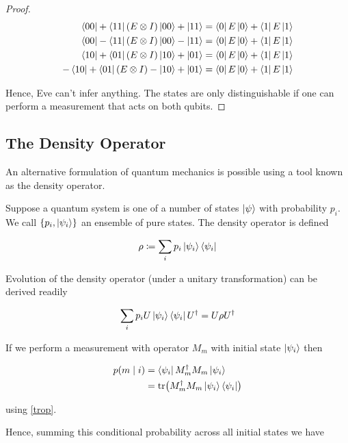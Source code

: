 \documentclass[11pt]{article}
\newcommand\0{\mathbf{0}}
\newcommand\<{\langle}
\renewcommand\>{\rangle}
\begin{document}
\begin{proof}
\begin{align*}
	\bra{00} + \bra{11} (E \otimes I) \ket{00} + \ket{11} &= \bra{0}E\ket{0} + \bra{1}E\ket{1}\\
 	\bra{00} - \bra{11}(E \otimes I)\ket{00} - \ket{11}&= \bra{0}E\ket{0} + \bra{1}E\ket{1}\\
 	\bra{10} + \bra{01} (E \otimes I)\ket{10} + \ket{01} &= \bra{0}E\ket{0} + \bra{1}E\ket{1}\\
 	-\bra{10} + \bra{01}(E \otimes I)-\ket{10} + \ket{01} &= \bra{0}E\ket{0} + \bra{1}E\ket{1}\\
\end{align*}
	
	Hence, Eve can't infer anything. The states are only distinguishable if one can perform a measurement that acts on both qubits.  
\end{proof}


\subsection{The Density Operator}

An alternative formulation of quantum mechanics is possible using a tool known as the density operator. 

Suppose a quantum system is one of a number of states $\ket{\psi}$ with probability $p_i$. We call $\{p_i, \ket{\psi_i} \}$ an ensemble of pure states. The density operator is defined

\begin{align*}
\rho \coloneqq \sum_i p_i \ket{\psi_i}\bra{\psi_i}	
\end{align*}

Evolution of the density operator (under a unitary transformation) can be derived readily

\begin{align*}
\sum_i p_i U\ket{\psi_i}\bra{\psi_i}U^\dag = U\rho U^\dag	
\end{align*}

If we perform a measurement with operator $M_m$ with initial state $\ket{\psi_i}$ then

\begin{align*}
p(m\mid i) &= \bra{\psi_i} M_m^\dag M_m \ket{\psi_i} \\
&= \tr(M_m^\dag M_m \ket{\psi_i}\bra{\psi_i})
\end{align*}

using \ref{trop}. 

Hence, summing this conditional probability across all initial states we have
\end{document}
